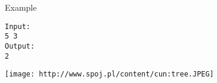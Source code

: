 Example
\begin{verbatim}
Input:
5 3
Output:
2
\end{verbatim}
\texttt{[image: http://www.spoj.pl/content/cun:tree.JPEG]}
